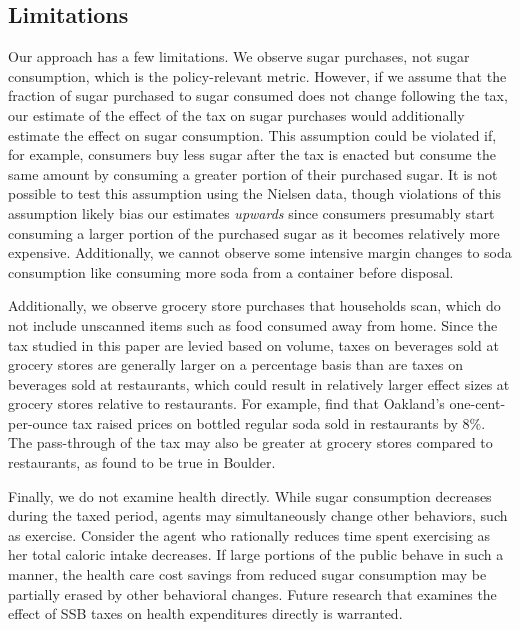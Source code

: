 \documentclass[12pt]{article}
\begin{document}
\subsection{Limitations}

Our approach has a few limitations. We observe sugar purchases, not sugar consumption, which is the policy-relevant metric. However, if we assume that the fraction of sugar purchased to sugar consumed does not change following the tax, our estimate of the effect of the tax on sugar purchases would additionally estimate the effect on sugar consumption. This assumption could be violated if, for example, consumers buy less sugar after the tax is enacted but consume the same amount by consuming a greater portion of their purchased sugar. It is not possible to test this assumption using the Nielsen data, though violations of this assumption likely bias our estimates \textit{upwards} since consumers presumably start consuming a larger portion of the purchased sugar as it becomes relatively more expensive. Additionally, we cannot observe some intensive margin changes to soda consumption like consuming more soda from a container before disposal.

Additionally, we observe grocery store purchases that households scan, which do not include unscanned items such as food consumed away from home. Since the tax studied in this paper are levied based on volume, taxes on beverages sold at grocery stores are generally larger on a percentage basis than are taxes on beverages sold at restaurants, which could result in relatively larger effect sizes at grocery stores relative to restaurants. For example, \textcite{marinello2020impact} find that Oakland's one-cent-per-ounce tax raised prices on bottled regular soda sold in restaurants by 8\%. The pass-through of the tax may also be greater at grocery stores compared to restaurants, as \textcite{cawley2021boulder} found to be true in Boulder.

Finally, we do not examine health directly. While sugar consumption decreases during the taxed period, agents may simultaneously change other behaviors, such as exercise. Consider the agent who rationally reduces time spent exercising as her total caloric intake decreases. If large portions of the public behave in such a manner, the health care cost savings from reduced sugar consumption may be partially erased by other behavioral changes. Future research that examines the effect of SSB taxes on health expenditures directly is warranted.


\clearpage
\printbibliography
\end{document}
